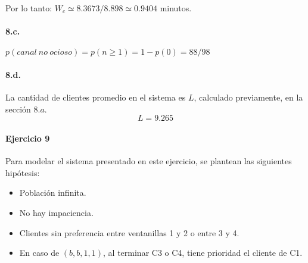 \documentclass{article}
\begin{document}
      Por lo tanto: $W_c \simeq 8.3673 / 8.898 \simeq 0.9404$ minutos.


   \paragraph{8.c.} $p(canal\:no\:ocioso) = p(n \ge 1) = 1 - p(0) = 88/98$

   \paragraph{8.d.} La cantidad de clientes promedio en el sistema es $L$, calculado previamente, en la sección $8.a$.
      $$L = 9.265$$


\paragraph{Ejercicio 9}
   Para modelar el sistema presentado en este ejercicio, se plantean las siguientes hipótesis:

   \begin{itemize}
      \item Población infinita.
      \item No hay impaciencia.
      \item Clientes sin preferencia entre ventanillas 1 y 2 o entre 3 y 4.
      \item En caso de $(b, b, 1, 1)$, al terminar C3 o C4, tiene prioridad el cliente de C1.
   \end{itemize}
\end{document}
